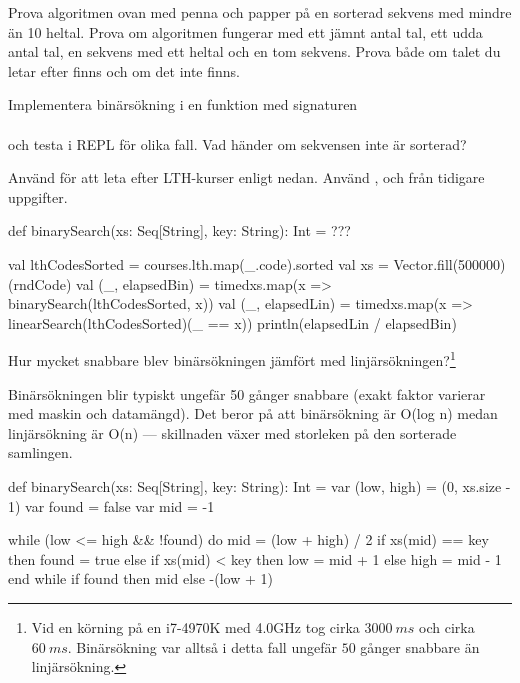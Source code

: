 \Subtask Prova algoritmen ovan med penna och papper på en sorterad sekvens med mindre än 10 heltal. Prova om algoritmen fungerar med ett jämnt antal tal, ett udda antal tal, en sekvens med ett heltal och en tom sekvens. Prova både om talet du letar efter finns och om det inte finns.

\Subtask Implementera binärsökning i en funktion med signaturen\\
\\
och testa i REPL för olika fall. Vad händer om sekvensen inte är sorterad?

\Subtask Använd  för att leta efter LTH-kurser enligt nedan. Använd ,  och  från tidigare uppgifter.
\begin{Code}
def binarySearch(xs: Seq[String], key: String): Int = ???

val lthCodesSorted = courses.lth.map(_.code).sorted
val xs = Vector.fill(500000)(rndCode)
val (_, elapsedBin) =
  timed{xs.map(x => binarySearch(lthCodesSorted, x))}
val (_, elapsedLin) =
  timed{xs.map(x => linearSearch(lthCodesSorted)(_ == x))}
println(elapsedLin / elapsedBin)
\end{Code}


\Subtask Hur mycket snabbare blev binärsökningen jämfört med linjärsökningen?\footnote{Vid en körning på en i7-4970K med 4.0GHz tog  cirka $3000~ms$ och  cirka $60~ms$. Binärsökning var alltså i detta fall ungefär $50$ gånger snabbare än linjärsökning.}


\SOLUTION


\TaskSolved \what


\SubtaskSolved
Binärsökningen blir typiskt ungefär 50 gånger snabbare (exakt faktor varierar med maskin och datamängd). Det beror på att binärsökning är O(log n) medan linjärsökning är O(n) --- skillnaden växer med storleken på den sorterade samlingen.

\SubtaskSolved
\begin{Code}
def binarySearch(xs: Seq[String], key: String): Int = 
  var (low, high) = (0, xs.size - 1)
  var found = false
  var mid = -1

  while (low <= high && !found) do
    mid = (low + high) / 2
    if xs(mid) == key then found = true
    else if xs(mid) < key then low = mid + 1
    else high = mid - 1
  end while
  if found then  mid else -(low + 1)
\end{Code}

